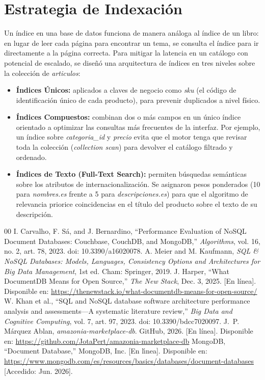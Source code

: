 \documentclass[conference]{IEEEtran}
\begin{document}
\section{Estrategia de Indexación}
Un índice en una base de datos funciona de manera análoga al índice de un libro: en lugar de leer cada página para encontrar un tema, se consulta el índice para ir directamente a la página correcta. Para mitigar la latencia en un catálogo con potencial de escalado, se diseñó una arquitectura de índices en tres niveles sobre la colección de \textit{articulos}:
\begin{itemize}
    \item \textbf{Índices Únicos:} aplicados a claves de negocio como \textit{sku} (el código de identificación único de cada producto), para prevenir duplicados a nivel físico.
    \item \textbf{Índices Compuestos:} combinan dos o más campos en un único índice orientado a optimizar las consultas más frecuentes de la interfaz. Por ejemplo, un índice sobre \textit{categoria\_id} y \textit{precio} evita que el motor tenga que revisar toda la colección (\textit{collection scan}) para devolver el catálogo filtrado y ordenado.
    \item \textbf{Índices de Texto (Full-Text Search):} permiten búsquedas semánticas sobre los atributos de internacionalización. Se asignaron pesos ponderados (10 para \textit{nombres.es} frente a 5 para \textit{descripciones.es}) para que el algoritmo de relevancia priorice coincidencias en el título del producto sobre el texto de su descripción.
\end{itemize}
\begin{thebibliography}{00}
 I. Carvalho, F. Sá, and J. Bernardino, ``Performance Evaluation of NoSQL Document Databases: Couchbase, CouchDB, and MongoDB,'' \textit{Algorithms}, vol. 16, no. 2, art. 78, 2023. doi: 10.3390/a16020078.
 A. Meier and M. Kaufmann, \textit{SQL \& NoSQL Databases: Models, Languages, Consistency Options and Architectures for Big Data Management}, 1st ed. Cham: Springer, 2019.
 J. Harper, ``What DocumentDB Means for Open Source,'' \textit{The New Stack}, Dec. 3, 2025. [En línea]. Disponible en: \url{https://thenewstack.io/what-documentdb-means-for-open-source/}
 W. Khan et al., ``SQL and NoSQL database software architecture performance analysis and assessments---A systematic literature review,'' \textit{Big Data and Cognitive Computing}, vol. 7, art. 97, 2023. doi: 10.3390/bdcc7020097.
 J.~P. Márquez Ablan, \textit{amazonia-marketplace-db}. GitHub, 2026. [En línea]. Disponible en: \href{https://github.com/JotaPert/amazonia-marketplace-db}{\url{https://github.com/JotaPert/amazonia-marketplace-db}}
 MongoDB, ``Document Database,'' MongoDB, Inc. [En l\'{\i}nea]. Disponible en: \href{https://www.mongodb.com/es/resources/basics/databases/document-databases}{\url{https://www.mongodb.com/es/resources/basics/databases/document-databases}} [Accedido: Jun. 2026].
\end{thebibliography}
\end{document}
